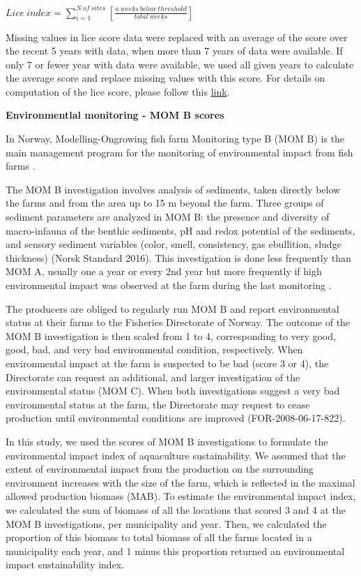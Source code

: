 \documentclass[
]{book}
\begin{document}
\(Lice \ index = \sum_{i = 1}^{N \ of \ sites}[\frac{n \ weeks\ below_ \ threshold}{total\ weeks}]\)

Missing values in lice score data were replaced with an average of the score over the recent 5 years with data, when more than 7 years of data were available. If only 7 or fewer year with data were available, we used all given years to calculate the average score and replace missing values with this score.
For details on computation of the lice score, please follow this \href{https://ohi-norway.github.io/nor-prep/prep/food_provision/Mariculture/lice_count_at_localities.html}{link}.

\textbf{Environmentlal monitoring - MOM B scores}

In Norway, Modelling-Ongrowing fish farm Monitoring type B (MOM B) is the main management program for the monitoring of environmental impact from fish farms \citep{ervik1997regulating}.

The MOM B investigation involves analysis of sediments, taken directly below the farms and from the area up to 15 m beyond the farm. Three groups of sediment parameters are analyzed in MOM B: the presence and diversity of macro-infauna of the benthic sediments, pH and redox potential of the sediments, and sensory sediment variables (color, smell, consistency, gas ebullition, sludge thickness) (Norsk Standard 2016). This investigation is done less frequently than MOM A, usually one a year or every 2nd year but more frequently if high environmental impact was observed at the farm during the last monitoring \citep{norge2016miljoovervaaking}.

The producers are obliged to regularly run MOM B and report environmental status at their farms to the Fisheries Directorate of Norway. The outcome of the MOM B investigation is then scaled from 1 to 4, corresponding to very good, good, bad, and very bad environmental condition, respectively. When environmental impact at the farm is suspected to be bad (score 3 or 4), the Directorate can request an additional, and larger investigation of the environmental status (MOM C). When both investigations suggest a very bad environmental status at the farm, the Directorate may request to cease production until environmental conditions are improved (FOR-2008-06-17-822).

In this study, we used the scores of MOM B investigations to formulate the environmental impact index of aquaculture sustainability. We assumed that the extent of environmental impact from the production on the surrounding environment increases with the size of the farm, which is reflected in the maximal allowed production biomass (MAB). To estimate the environmental impact index, we calculated the sum of biomass of all the locations that scored 3 and 4 at the MOM B investigations, per municipality and year. Then, we calculated the proportion of this biomass to total biomass of all the farms located in a municipality each year, and 1 minus this proportion returned an environmental impact sustainability index.
\end{document}
